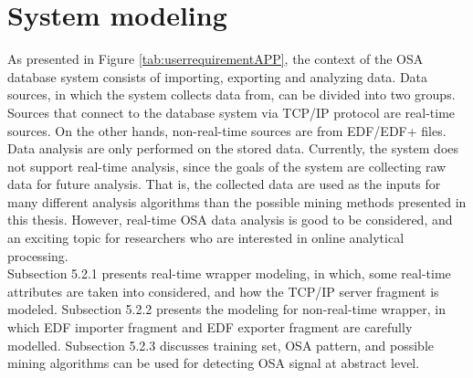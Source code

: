 \section{System modeling}
As presented in Figure \ref{tab:userrequirementAPP}, the context of the OSA database system consists of importing, exporting and analyzing data. Data sources, in which the system collects data from, can be divided into two groups. Sources that connect to the database system via TCP/IP protocol are real-time sources. On the other hands, non-real-time sources are from EDF/EDF+ files. Data analysis are only performed on the stored data. Currently, the system does not support real-time analysis, since the goals of the system are collecting raw data for future analysis. That is, the collected data are used as the inputs for many different analysis algorithms than the possible mining methods presented in this thesis. However, real-time OSA data analysis is good to be considered, and an exciting topic for researchers who are interested in online analytical processing.\\
Subsection 5.2.1 presents real-time wrapper modeling, in which, some real-time attributes are taken into considered, and how the TCP/IP server fragment is modeled. Subsection 5.2.2 presents the modeling for non-real-time wrapper, in which EDF importer fragment and EDF exporter fragment are carefully modelled. Subsection 5.2.3 discusses training set, OSA pattern, and possible mining algorithms can be used for detecting OSA signal at abstract level.
